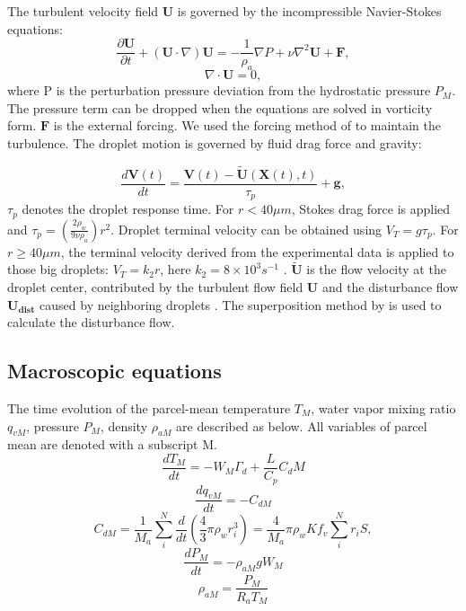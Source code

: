 The turbulent velocity field $\mathbf{U}$ is governed by the incompressible Navier-Stokes equations:
\begin{equation} \label{eq:NSeq}
\frac{\partial \mathbf{U}}{\partial t}+(\mathbf{U}\cdot\nabla) \mathbf{U} = -\frac{1}{\rho_a}\nabla P+\nu \nabla^2\mathbf{U}+\mathbf{F},
\end{equation}
\begin{equation} \label{eq:incomp}
\nabla\cdot\mathbf{U}=0,
\end{equation}
where P is the perturbation pressure deviation from the hydrostatic pressure $P_M$. The pressure term can be dropped when the equations are solved in vorticity form. $\mathbf{F}$ is the external forcing. We used the forcing method of \citet{Chen2016} to maintain the turbulence. The droplet motion is governed by fluid drag force and gravity:

\begin{equation}
\frac{d\mathbf{V}(t)}{dt}=\frac{\mathbf{V}(t)-\tilde{\mathbf{U}}(\mathbf{X}(t),t)}{\tau_p}+\mathbf{g}, \label{eqn:drop}
\end{equation}
$\tau_p$ denotes the droplet response time. For $r<40 \mu m$, Stokes drag force is applied and $\tau_p=(\frac{2\rho_w}{9\nu\rho_a})r^2$. Droplet terminal velocity can be obtained using $V_T=g\tau_p$. For $r\geq 40 \mu m$, the terminal velocity derived from the experimental data is applied to those big droplets: $V_T=k_2r$, here $k_2=8 \times 10^3s^{-1}$ \citep[p.126]{Rogers1989}. $\tilde{\mathbf{U}}$ is the flow velocity at the droplet center, contributed by the turbulent flow field $\mathbf{U}$ and the disturbance flow $\mathbf{U_{dist}}$ caused by neighboring droplets \citep{Chen2018}. The superposition method by \citet{Wang2005b} is used to calculate the disturbance flow.

 
\subsection{Macroscopic equations}\label{sec:macro}
The time evolution of the parcel-mean temperature $T_M$, water vapor mixing ratio $q_{vM}$, pressure $P_M$, density $\rho_{aM}$ are described as below. All variables of parcel mean are denoted with a subscript M.
\begin{equation}
\frac{dT_M}{dt}=-W_M\Gamma_d+\frac{L}{C_p}C_dM
\end{equation}
\begin{equation}
\frac{dq_{vM}}{dt}=-C_{dM}
\end{equation}
\begin{equation}
C_{dM}=\frac{1}{M_a} \sum^N_i{\frac{d}{dt}(\frac{4}{3}\pi\rho_wr_i^3)}=\frac{4}{M_a}\pi\rho_wKf_v\sum^N_i{r_iS},
\end{equation}
\begin{equation}
\frac{dP_M}{dt}=-\rho_{aM}gW_M
\end{equation}
\begin{equation}
\rho_{aM}=\frac{P_M}{R_aT_M}
\end{equation}

